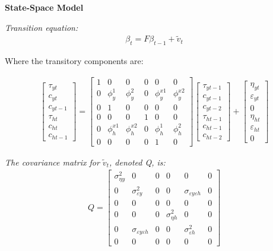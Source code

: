 \documentclass[fleqn]{article}
\begin{document}
\begin{outline}[enumerate]
\textbf{State-Space Model}

\textit{Transition equation:}
\begin{align}
\beta_t = F\beta_{t-1} + \tilde{v}_t
\end{align}

Where the transitory components are:

\begin{align}
\begin{bmatrix}
\tau_{yt}	\\
c_{yt}		\\
c_{yt-1}		\\
\tau_{ht}	\\
c_{ht}		\\
c_{ht-1}		
\end{bmatrix}
=
\begin{bmatrix}
1	& 0	& 0	& 0	& 0	& 0	\\
0	& \phi^1_y	& \phi^2_y	& 0	& \phi^{x1}_y	& \phi^{x2}_y	\\
0	& 1	& 0	& 0 & 0 & 0  \\
0	& 0	& 0	& 1	& 0	& 0 \\
0	& \phi^{x1}_h	& \phi^{x2}_h	& 0 &\phi^1_h	& \phi^2_h	\\
0	& 0	& 0	& 0 & 1 & 0
\end{bmatrix}
\begin{bmatrix}
\tau_{yt-1}	\\
c_{yt-1}		\\
c_{yt-2}		\\
\tau_{ht-1}	\\
c_{ht-1}		\\
c_{ht-2}		
\end{bmatrix}
+
\begin{bmatrix}
\eta_{yt}	\\
\varepsilon_{yt}		\\
0	\\
\eta_{ht}	\\
\varepsilon_{ht}		\\
0	
\end{bmatrix}
\end{align}

\textit{The covariance matrix for $\tilde{v}_t$, denoted Q, is: }
\begin{align}
Q = 
\begin{bmatrix}
\sigma^2_{\eta y}	& 0	 &0 & 0	& 0	& 0	\\
0	& \sigma^2_{\varepsilon y}	& 0	& 0	& \sigma_{\varepsilon y \varepsilon h}	& 0	\\
0	&	0	& 0 & 0 & 0 & 0	\\
0	& 0	& 0	& \sigma^2_{\eta h}	& 0	& 0	\\
0	& \sigma_{\varepsilon y \varepsilon h}	& 0	& 0	& \sigma^2_{\varepsilon h}		& 0	\\
0	&0	& 0	& 0
	& 0	& 0
\end{bmatrix}
\end{align}


\end{outline}
\end{document}
